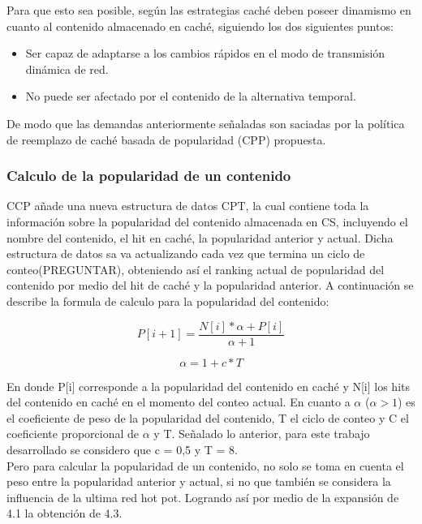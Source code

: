 \documentclass[12pt]{ociamthesis}  %
\begin{document}
Para que esto sea posible, según \cite{ran2013performance} las estrategias caché deben poseer dinamismo en cuanto al contenido almacenado en caché, siguiendo los dos siguientes puntos:

\begin{itemize}
	\item Ser capaz de adaptarse a los cambios rápidos en el modo de transmisión dinámica de red.
	\item No puede ser afectado por el contenido de la alternativa temporal.
\end{itemize}

De modo que las demandas anteriormente señaladas son saciadas por la política de reemplazo de caché basada de popularidad (CPP) propuesta.\\
\subsubsection{Calculo de la popularidad de un contenido}

CCP añade una nueva estructura de datos CPT, la cual contiene toda la información sobre la popularidad del contenido almacenada en CS, incluyendo el nombre del contenido, el hit en caché, la popularidad anterior y actual. Dicha estructura de datos sa va actualizando cada vez que termina un ciclo de conteo(PREGUNTAR), obteniendo así el ranking actual de popularidad del contenido por medio del hit de caché y la popularidad anterior.
A continuación se describe la formula de calculo para la popularidad del contenido:

\begin{equation}
P[i+1] = \frac{N[i]*\alpha+P[i]}{\alpha+1}
\end{equation}

\begin{equation}
\alpha=1+c*T
\end{equation}

En donde P[i] corresponde a la popularidad del contenido en caché y N[i] los hits del contenido en caché en el momento del conteo actual. En cuanto a $\alpha$ ($\alpha>1$) es el coeficiente de peso de la popularidad del contenido, T el ciclo de conteo y C el coeficiente proporcional de $\alpha$ y T. Señalado lo anterior, para este trabajo desarrollado se considero que c = 0,5 y T = 8.\\

Pero para calcular la popularidad de un contenido, no solo se toma en cuenta el peso entre la popularidad anterior y actual, si no que también se considera la influencia de la ultima red hot pot. Logrando así por medio de la expansión de 4.1 la obtención de 4.3.
\end{document}
